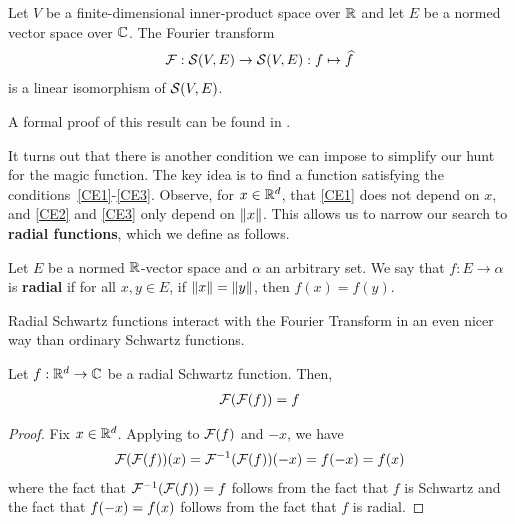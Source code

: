 \begin{boxtheorem}
    Let $V$ be a finite-dimensional inner-product space over $\mathbb{R}$ and let $E$ be a normed vector space over $\mathbb{C}$. The Fourier transform
    \begin{align*}
        \mathcal{F} : \mathcal{S}(V, E) \to \mathcal{S}(V, E) : f \mapsto \widehat{f}
    \end{align*}
    is a linear isomorphism of $\mathcal{S}(V, E)$. %
\end{boxtheorem}

A formal proof of this result can be found in \mathlib.

It turns out that there is another condition we can impose to simplify our hunt for the magic function. The key idea is to find a function satisfying the conditions~\ref{CE1}-\ref{CE3}. Observe, for $x \in \mathbb{R}^d$, that \ref{CE1} does not depend on $x$, and \ref{CE2} and \ref{CE3} only depend on $\left\lVert x \right\rVert$. This allows us to narrow our search to \textbf{radial functions}, which we define as follows.

\begin{boxdefinition}
    Let $E$ be a normed $\mathbb{R}$-vector space and $\alpha$ an arbitrary set. We say that $f : E \to \alpha$ is \textbf{radial} if for all $x, y \in E$, if $\left\lVert x \right\rVert = \left\lVert y \right\rVert$, then $f(x) = f(y)$.
\end{boxdefinition}

Radial Schwartz functions interact with the Fourier Transform in an even nicer way than ordinary Schwartz functions.

\begin{boxproposition}\label{Ch3:Prop:RadialSchwartzFourier}
    Let $f : \mathbb{R}^d \to \mathbb{C}$ be a radial Schwartz function. Then,
    \begin{align*}
        \mathcal{F}\!\left( \mathcal{F}\!\left( f \right) \right) = f
    \end{align*}
\end{boxproposition}
\begin{proof}
    Fix $x \in \mathbb{R}^d$. Applying  to $\mathcal{F}\!\left( f \right)$ and $-x$, we have
    \begin{align*}
        \F\of{\F\of{f}}\of{x} = \F\inv\of{\F\of{f}}\of{-x} = f\of{-x} = f\of{x}
    \end{align*}
    where the fact that $\mathcal{F}^{-1}\!\left( \mathcal{F}\!\left( f \right) \right) = f$ follows from the fact that $f$ is Schwartz and the fact that $f\!\left( -x \right) = f\!\left( x \right)$ follows from the fact that $f$ is radial.
\end{proof}

